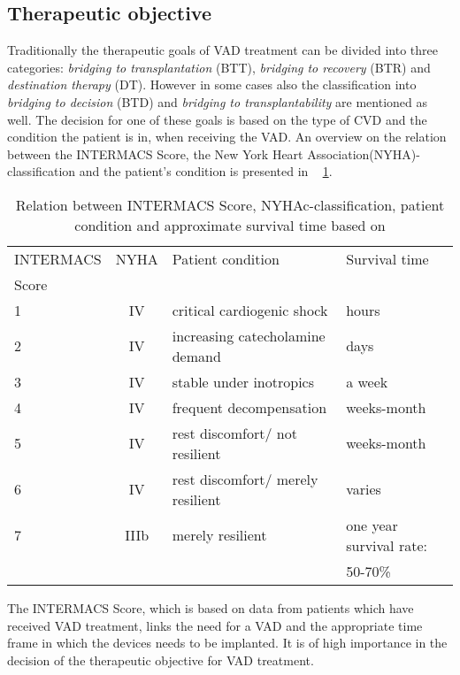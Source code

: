 \subsection{Therapeutic objective}
Traditionally the therapeutic goals of VAD treatment can be divided into three categories: \textit{bridging to transplantation} (BTT), \textit{bridging to recovery} (BTR) and \textit{destination therapy} (DT). However in some cases also the classification into \textit{bridging to decision} (BTD) and \textit{bridging to transplantability} are mentioned as well. The decision for one of these goals is based on the type of CVD and the condition the patient is in, when receiving the VAD.\cite{VAD6} An overview on the relation between the INTERMACS Score, the New York Heart Association(NYHA)-classification and the patient's condition is presented in \tablename~ \ref{tab:Table1}.
\begin{table}
  \begin{tabularx}{\textwidth}{l|c|l|l}
    \toprule
    INTERMACS & NYHA & Patient condition & Survival time  \\
    Score & & &\\
    \midrule
    1 & IV & critical cardiogenic shock & hours \\
    2 & IV & increasing catecholamine demand & days \\
    3 & IV & stable under inotropics & a week \\
    4 & IV & frequent decompensation & weeks-month \\
    5 & IV & rest discomfort/ not resilient & weeks-month \\
    6 & IV & rest discomfort/ merely resilient & varies \\
    7 & IIIb & merely resilient & one year survival rate: \\
     & & & 50-70\% \\
     \bottomrule
  \end{tabularx}
  \caption{Relation between INTERMACS Score, NYHAc-classification, patient condition and approximate survival time based on \cite{VAD5}}
  \label{tab:Table1}
\end{table}
The INTERMACS Score, which is based on data from patients which have received VAD treatment, links the need for a VAD and the appropriate time frame in which the devices needs to be implanted. It is of high importance in the decision of the therapeutic objective for VAD treatment. \cite{VAD7}

